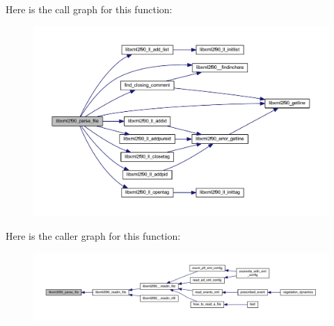 Here is the call graph for this function\+:\nopagebreak
\begin{figure}[H]
\begin{center}
\leavevmode
\includegraphics[width=350pt]{libxml2f90_8f90__pp_8f90_a41bf2706485a325b4b1515c83ac50a67_cgraph}
\end{center}
\end{figure}




Here is the caller graph for this function\+:\nopagebreak
\begin{figure}[H]
\begin{center}
\leavevmode
\includegraphics[width=350pt]{libxml2f90_8f90__pp_8f90_a41bf2706485a325b4b1515c83ac50a67_icgraph}
\end{center}
\end{figure}


\hypertarget{libxml2f90_8f90__pp_8f90_af6b4f4c6b9bd06993e7ab5cb607e7228}{}
